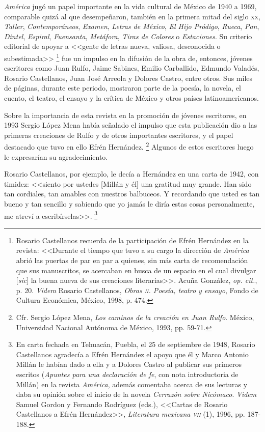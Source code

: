 \documentclass[14pt,twoside,final]{extbook} %
\let\oldfootnote\footnote
\renewcommand\footnote[1]{%
\oldfootnote{\hspace{1mm}#1}}
\begin{document}
\emph{América} jugó un papel importante en la vida cultural de México de 1940 a
1969, comparable quizá al que desempeñaron, también en la primera mitad del siglo
\textsc{xx}, \emph{Taller}, \emph{Contemporáneos}, \emph{Examen}, \emph{Letras de México}, \emph{El Hijo Pródigo}, \emph{Rueca}, \emph{Pan}, \emph{Dintel}, \emph{Espiral}, \emph{Fuensanta}, \emph{Metáfora}, \emph{Tiras de Colores} o \emph{Estaciones}. Su criterio editorial de apoyar a <<gente de letras nueva, valiosa, desconocida o subestimada>>\footnote{Rosario Castellanos recuerda de la participación de Efrén Hernández en la revista: <<Durante el tiempo que tuvo a su cargo la dirección de \emph{América} abrió las puertas de par en par a quienes, sin más carta de recomendación que sus manuscritos, se acercaban en busca de un espacio en el cual divulgar [\emph{sic}] la buena nueva de sus creaciones literarias>>. Acuña González, \emph{op. cit.}, p. 20. \emph{Videm} Rosario Castellanos, \emph{Obras \textsc{ii}. Poesía, teatro y ensayo}, Fondo de Cultura Económica, México, 1998, p. 474.} fue un impulso en la difusión de la obra de, entonces, jóvenes escritores como Juan Rulfo, Jaime Sabines, Emilio Carballido, Edmundo Valadés, Rosario Castellanos, Juan José Arreola y Dolores Castro, entre otros. Sus miles de páginas, durante este periodo, mostraron parte de la poesía, la novela, el cuento, el teatro, el ensayo y la crítica de México y otros países latinoamericanos.

Sobre la importancia de esta revista en la promoción de jóvenes escritores, en 1993 Sergio López Mena había señalado el impulso que esta publicación dio a las primeras creaciones de Rulfo y de otros importantes escritores, y el papel destacado que tuvo en ello Efrén Hernández.\footnote{Cfr. Sergio López Mena, \emph{Los caminos de la creación en Juan Rulfo}. México, Universidad Nacional Autónoma de México, 1993, pp. 59-71.} Algunos de estos escritores luego le expresarían su agradecimiento.

Rosario Castellanos, por ejemplo, le decía a Hernández en una carta de 1942, con timidez: <<siento por ustedes [Millán y él] una gratitud muy grande. Han sido tan cordiales, tan amables con nuestros balbuceos. Y recordando que usted es tan bueno y tan sencillo y sabiendo que yo jamás le diría estas cosas personalmente, me atreví a escribírselas>>.\footnote{En carta fechada en Tehuacán, Puebla, el 25 de septiembre de 1948, Rosario Castellanos agradecía a Efrén Hernández el apoyo que él y Marco Antonio Millán le habían dado a ella y a Dolores Castro al publicar sus primeros escritos (\emph{Apuntes para una declaración de fe}, con nota introductoria de
Millán) en la revista \emph{América}, además comentaba acerca de sus lecturas y daba su opinión sobre el inicio de la novela \emph{Cerrazón sobre Nicómaco}. \emph{Videm} Samuel Gordon y Fernando Rodríguez (eds.), <<Cartas de Rosario Castellanos a Efrén Hernández>>, \emph{Literatura mexicana \textsc{vii}} (1), 1996, pp. 187-188.}
\end{document}
